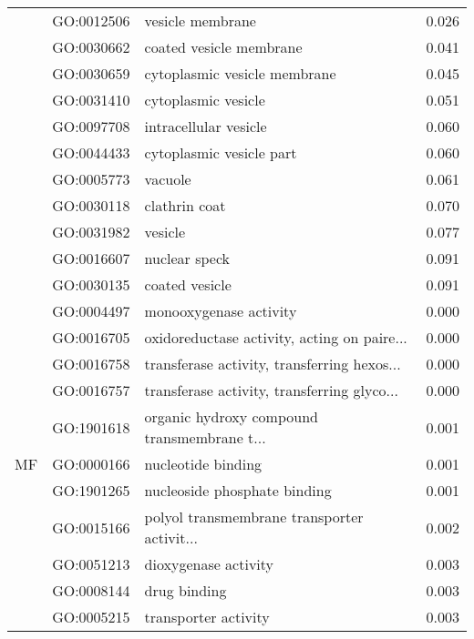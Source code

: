\begin{longtable}{lllr}
   & GO:0012506 &                             vesicle membrane &         0.026 \\
   & GO:0030662 &                      coated vesicle membrane &         0.041 \\
   & GO:0030659 &                 cytoplasmic vesicle membrane &         0.045 \\
   & GO:0031410 &                          cytoplasmic vesicle &         0.051 \\
   & GO:0097708 &                        intracellular vesicle &         0.060 \\
   & GO:0044433 &                     cytoplasmic vesicle part &         0.060 \\
   & GO:0005773 &                                      vacuole &         0.061 \\
   & GO:0030118 &                                clathrin coat &         0.070 \\
   & GO:0031982 &                                      vesicle &         0.077 \\
   & GO:0016607 &                                nuclear speck &         0.091 \\
   & GO:0030135 &                               coated vesicle &         0.091 \\
\cline{1-4}
\multirow{47}{*}{MF} & GO:0004497 &                       monooxygenase activity &         0.000 \\
   & GO:0016705 &  oxidoreductase activity, acting on paire... &         0.000 \\
   & GO:0016758 &  transferase activity, transferring hexos... &         0.000 \\
   & GO:0016757 &  transferase activity, transferring glyco... &         0.000 \\
   & GO:1901618 &  organic hydroxy compound transmembrane t... &         0.001 \\
   & GO:0000166 &                           nucleotide binding &         0.001 \\
   & GO:1901265 &                 nucleoside phosphate binding &         0.001 \\
   & GO:0015166 &  polyol transmembrane transporter activit... &         0.002 \\
   & GO:0051213 &                         dioxygenase activity &         0.003 \\
   & GO:0008144 &                                 drug binding &         0.003 \\
   & GO:0005215 &                         transporter activity &         0.003 \\

\end{longtable}
